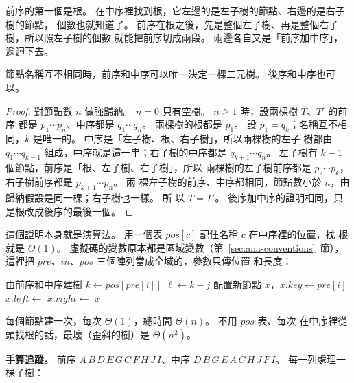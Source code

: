 前序的第一個是根。 在中序裡找到根，它左邊的是左子樹的節點、右邊的是右子樹的節點，
個數也就知道了。 前序在根之後，先是整個左子樹、再是整個右子樹，所以照左子樹的個數
就能把前序切成兩段。 兩邊各自又是「前序加中序」，遞迴下去。

\begin{theorem}
\label{thm:bt-pre-in}
節點名稱互不相同時，前序和中序可以唯一決定一棵二元樹。 後序和中序也可以。
\end{theorem}

\begin{proof}
對節點數 $n$ 做強歸納。 $n = 0$ 只有空樹。 $n \ge 1$ 時，設兩棵樹 $T$、$T'$ 的前序
都是 $p_1 \cdots p_n$、中序都是 $q_1 \cdots q_n$。 兩棵樹的根都是 $p_1$。 設 $p_1 =
q_k$；名稱互不相同，$k$ 是唯一的。 中序是「左子樹、根、右子樹」，所以兩棵樹的左子
樹都由 $q_1 \cdots q_{k-1}$ 組成，中序就是這一串；右子樹的中序都是
$q_{k+1} \cdots q_n$。 左子樹有 $k - 1$ 個節點，前序是「根、左子樹、右子樹」，所以
兩棵樹的左子樹前序都是 $p_2 \cdots p_k$，右子樹前序都是 $p_{k+1} \cdots p_n$。 兩
棵左子樹的前序、中序都相同，節點數小於 $n$，由歸納假設是同一棵；右子樹也一樣。 所
以 $T = T'$。 後序加中序的證明相同，只是根改成後序的最後一個。
\end{proof}

這個證明本身就是演算法。 用一個表 $\mathit{pos}[c]$ 記住名稱 $c$ 在中序裡的位置，找
根就是 $\Theta(1)$。 虛擬碼的變數原本都是區域變數（第~\ref{sec:ana-conventions}~節），
這裡把 $\mathit{pre}$、$\mathit{in}$、$\mathit{pos}$ 三個陣列當成全域的，參數只傳位置
和長度：

\begin{pseudo}[label=alg:bt-pre-in]{由前序和中序建樹}
 
        \State \Return \NIL
    \EndIf
    \State $k \gets \mathit{pos}[\mathit{pre}[i]]$ 
    \State $\ell \gets k - j$ 
    \State 配置新節點 $x$，$x.\mathit{key} \gets \mathit{pre}[i]$
    \State $x.\mathit{left} \gets$ 
    \State $x.\mathit{right} \gets$ 
    \State \Return $x$
\EndFunction
\end{pseudo}

每個節點建一次，每次 $\Theta(1)$，總時間 $\Theta(n)$。 不用 $\mathit{pos}$ 表、每次
在中序裡從頭找根的話，最壞（歪斜的樹）是 $\Theta(n^2)$。

\textbf{手算追蹤。} 前序 $A\,B\,D\,E\,G\,C\,F\,H\,J\,I$、中序
$D\,B\,G\,E\,A\,C\,H\,J\,F\,I$。 每一列處理一棵子樹：

